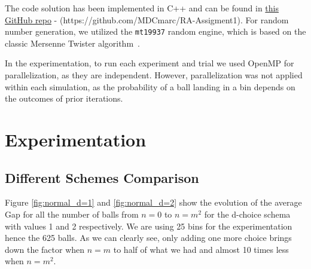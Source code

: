 \documentclass[a4paper, 11pt]{article}
\begin{document}
The code solution has been implemented in C++ and can be found in \href{https://github.com/MDCmarc/RA-Assigment1}{this GitHub repo} - (https://github.com/MDCmarc/RA-Assigment1). 
For random number generation, we utilized the \texttt{mt19937} random engine, which is based on the classic Mersenne Twister algorithm~\cite{MersenneTwister}. 

In the experimentation, to run each experiment and trial we used OpenMP for parallelization, as they are independent. However, parallelization was not applied within each simulation, as the probability of a ball landing in a bin depends on the outcomes of prior iterations.

\clearpage
\section{Experimentation}


\subsection{Different Schemes Comparison}

Figure \ref{fig:normal_d=1} and \ref{fig:normal_d=2} show the evolution of the average Gap for all the number of balls from $n=0$ to $n=m^2$ for the d-choice schema with values 1 and 2 respectively. We are using 25 bins for the experimentation hence the 625 balls. As we can clearly see, only adding one more choice brings down the factor when $n=m$ to half of what we had and almost 10 times less when $n=m^2$.
\end{document}
